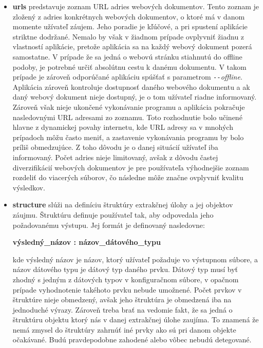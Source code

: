 \begin{itemize}
  \item \textbf{urls} predstavuje zoznam URL adries webových dokumentov. Tento zoznam je zložený z adries konkrétnych webových dokumentov, o ktoré má v danom momente užívateľ záujem. Jeho poradie je kľúčové, a pri spustení aplikácie striktne dodržané. Nemalo by však v žiadnom prípade ovplyvniť žiadnu z vlastností aplikácie, pretože aplikácia sa na každý webový dokument pozerá samostatne. V prípade že sa jedná o webovú stránku stiahnutú do offline podoby, je potrebné určiť absolútnu cestu k danému dokumentu. V takom prípade je zároveň odporúčané aplikáciu spúšťať s parametrom \textit{\texttt{-{}-}offline}. Aplikácia zároveň kontroluje dostupnosť daného webového dokumentu a ak daný webový dokument nieje dostupný, je o tom užívateľ riadne informovaný. Zároveň však nieje ukončené vykonávanie programu a aplikácia pokračuje nasledovnými URL adresami zo zoznamu. Toto rozhodnutie bolo učinené hlavne z dynamickej povahy internetu, kde URL adresy sa v mnohých prípadoch môžu často meniť, a zastavenie vykonávania programu by bolo príliš obmedzujúce. Z toho dôvodu je o danej situácií užívateľ iba informovaný. Počet adries nieje limitovaný, avšak z dôvodu častej diverzifikácií webových dokumentov je pre používateľa výhodnejšie zoznam rozdeliť do viacerých súborov, čo následne môže značne ovplyvniť kvalitu výsledkov.
  \item \textbf{structure} slúži na definíciu štruktúry extrakčnej úlohy a jej objektov záujmu. Štruktúru definuje používateľ tak, aby odpovedala jeho požadovanému výstupu. Jej formát je definovaný nasledovne:
  
  \textbf{výsledný\_názov : názov\_dátového\_typu}
  
  kde výsledný názov je názov, ktorý užívateľ požaduje vo výstupnom súbore, a názov dátového typu je dátový typ daného prvku. Dátový typ musí byť zhodný s jedným z dátových typov v konfiguračnom súbore, v opačnom prípade vyhodnotenie takéhoto prvku nebude umožnené. Počet prvkov v štruktúre nieje obmedzený, avšak jeho štruktúra je obmedzená iba na jednoduché výrazy. Zároveň treba brať na vedomie fakt, že sa jedná o štruktúru objektu ktorý nás v danej extrakčnej úlohe zaujíma. To znamená že nemá zmysel do štruktúry zahrnúť iné prvky ako sú pri danom objekte očakávané. Budú pravdepodobne zahodené alebo vôbec nebudú detegované.
  

\end{itemize}
